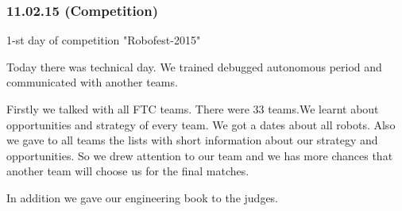 \subsubsection{11.02.15 (Competition)}
\begin{center}
	1-st day of competition "Robofest-2015"
\end{center}
Today there was technical day. We trained debugged autonomous period and communicated with another teams.\newline

Firstly we talked with all FTC teams. There were 33 teams.We learnt about opportunities and strategy of every team. We got a dates about all robots. Also we gave to all teams the lists with short information about our strategy and opportunities. So we drew attention to our team and we has more chances that another team will choose us for the final matches.\newline

In addition we gave our engineering book to the judges.\newline

